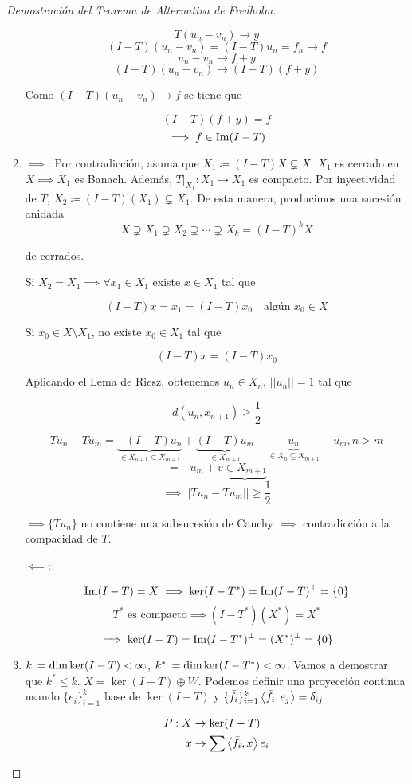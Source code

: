 \begin{proof}[Demostración del Teorema de Alternativa de Fredholm]
\begin{enumerate}[label=\alph*)]
      \[T(u_n-v_n)\to y\]
      \[(I-T)(u_n-v_n)=(I-T)u_n=f_n\to f\]
      \[u_n-v_n\to f+y\]
      \[(I-T)(u_n-v_n)\to (I-T)(f+y)\]

      Como $(I-T)(u_n-v_n)\to f$ se tiene que 

      \[(I-T)(f+y)=f\]
      \[\implies f\in \operatorname{Im}(I-T)\]

      \item $\implies$: Por contradicción, asuma que $X_1\coloneqq (I-T)X\subsetneq X$. $X_1$ es cerrado en $X\implies X_1$ es Banach. Además, $T\big\rvert_{X_1}:X_1\to X_1$ es compacto. Por inyectividad de $T$, $X_2\coloneqq (I-T)(X_1)\subsetneq X_1$. De esta manera, producimos una sucesión anidada 
      \[X\supsetneq X_1\supsetneq X_2\supsetneq \cdots\supsetneq X_k=(I-T)^k X\]

      de cerrados.

      Si $X_2=X_1\implies\forall x_1\in X_1$  existe $x\in X_1$ tal que 

      \[(I-T)x=x_1=(I-T)x_0\quad \text{algún }x_0\in X\]

      Si $x_0\in X\setminus X_1$, no existe $x_0\in X_1$ tal que 

      \[(I-T)x=(I-T)x_0\]

      Aplicando el Lema de Riesz, obtenemos $u_n\in X_n$, $||u_n||=1$ tal que 

      \[d(u_n,x_{n+1})\geq \frac{1}{2}\]

      \[T u_n-T u_m=\underbrace{-(I-T)u_n}_{\in X_{n+1}\subseteq X_{m+1}}+\underbrace{(I-T)u_m}_{\in X_{m+1}}+\underbrace{u_n}_{\in X_n\subseteq X_{m+1}}-u_m,n>m\]
      \[=-u_m+v\underbrace{\in X_{m+1}}\]
      \[\implies ||T u_n-Tu_m||\geq \frac{1}{2}\]

      $\implies\{T u_n\}$ no contiene una subsucesión de Cauchy $\implies$ contradicción a la compacidad de $T$.

      $\impliedby$: 

      \[\operatorname{Im} (I-T)=X\implies \ker(I-T^*)=\operatorname{Im} (I-T)^\perp=\{0\}\]
      \[T^*\text{ es compacto}\implies (I-T^*)(X^*)=X^*\]
      \[\implies \ker (I-T)=\operatorname{Im} (I-T^*)^\perp=(X^*)^\perp=\{0\}\]

      \item $k\coloneqq \operatorname{dim} \ker (I-T)<\infty$, $k^*\coloneqq \operatorname{dim}\ker (I-T^*)<\infty$. Vamos a demostrar que $k^*\leq k$. $X=\ker (I-T)\oplus W$. Podemos definir una proyección continua usando $\{e_i\}_{i=1}^k$ base de $\ker (I-T)$ y $\{\bar f_i\}_{i=1}^k \left\langle \bar f_i,e_j\right\rangle=\delta_{ij}$ 
      
      \begin{align*}
         P:X&\to \ker (I-T)\\
         x&\to \sum \left\langle \bar f_i,x\right\rangle e_i
      \end{align*}


\end{enumerate}
\end{proof}
